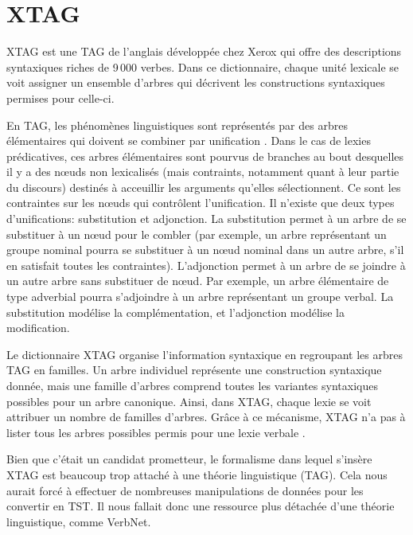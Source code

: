 \section{XTAG}

XTAG est une \ac{TAG} de l'anglais développée chez Xerox \citep{XTAGResearchGroupLexicalizedTreeAdjoining2001, ParoubekXTAGGraphicalWorkbench1992} qui offre des descriptions syntaxiques riches de 9\,000 verbes. Dans ce dictionnaire, chaque unité lexicale se voit assigner un ensemble d'arbres qui décrivent les constructions syntaxiques permises pour celle-ci.

En \ac{TAG}, les phénomènes linguistiques sont représentés par des arbres élémentaires qui doivent se combiner par unification \citep{JoshiTreeAdjoiningGrammars1997}. Dans le cas de lexies prédicatives, ces arbres élémentaires sont pourvus de branches au bout desquelles il y a des n\oe{}uds non lexicalisés (mais contraints, notamment quant à leur partie du discours) destinés à acceuillir les arguments qu'elles sélectionnent. Ce sont les contraintes sur les n\oe{}uds qui contrôlent l'unification. Il n'existe que deux types d'unifications: substitution et adjonction. La substitution permet à un arbre de se substituer à un n\oe{}ud pour le combler (par exemple, un arbre représentant un groupe nominal pourra se substituer à un n\oe{}ud nominal dans un autre arbre, s'il en satisfait toutes les contraintes). L'adjonction permet à un arbre de se joindre à un autre arbre sans substituer de n\oe{}ud. Par exemple, un arbre élémentaire de type adverbial pourra s'adjoindre à un arbre représentant un groupe verbal. La substitution modélise la complémentation, et l'adjonction modélise la modification.

Le dictionnaire XTAG organise l'information syntaxique en regroupant les arbres \ac{TAG} en familles. Un arbre individuel représente une construction syntaxique donnée, mais une famille d'arbres comprend toutes les variantes syntaxiques possibles pour un arbre canonique. Ainsi, dans XTAG, chaque lexie se voit attribuer un nombre de familles d'arbres. Grâce à ce mécanisme, XTAG n'a pas à lister tous les arbres possibles permis pour une lexie verbale \citep{DoranXTAGSystemWide1994}.

Bien que c'était un candidat prometteur, le formalisme dans lequel s'insère XTAG est beaucoup trop attaché à une théorie linguistique (\ac{TAG}). Cela nous aurait forcé à effectuer de nombreuses manipulations de données pour les convertir en \ac{TST}. Il nous fallait donc une ressource plus détachée d'une théorie linguistique, comme VerbNet.

